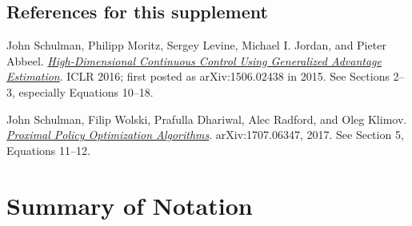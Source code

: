 \documentclass[11pt, a4paper]{article}
\begin{document}
\subsection*{References for this supplement}

John Schulman, Philipp Moritz, Sergey Levine, Michael I. Jordan, and Pieter Abbeel. \href{https://arxiv.org/abs/1506.02438}{\emph{High-Dimensional Continuous Control Using Generalized Advantage Estimation}}. ICLR 2016; first posted as arXiv:1506.02438 in 2015. See Sections 2--3, especially Equations 10--18.

John Schulman, Filip Wolski, Prafulla Dhariwal, Alec Radford, and Oleg Klimov. \href{https://arxiv.org/abs/1707.06347}{\emph{Proximal Policy Optimization Algorithms}}. arXiv:1707.06347, 2017. See Section 5, Equations 11--12.

\section{Summary of Notation}
\end{document}
